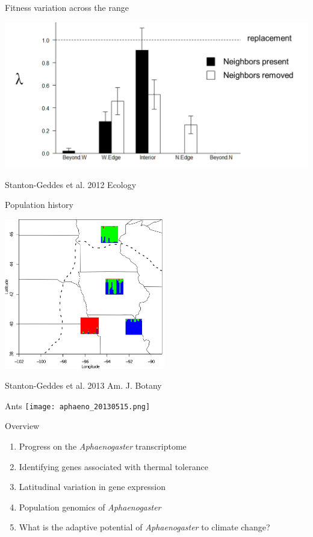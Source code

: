 \documentclass{beamer}
\begin{document}
\begin{frame}{Fitness variation across the range}
	\begin{center}
		\includegraphics[width=\textwidth, height=\textheight, keepaspectratio]{chamae2010_popgrowth.png}
	\end{center}
	\tiny{Stanton-Geddes et al. 2012 Ecology}
\end{frame}

\begin{frame}{Population history}
	\begin{center}
		\includegraphics[width=7cm]{chamae_popgen.png}
	\end{center}	
	\tiny{Stanton-Geddes et al. 2013 Am. J. Botany}
\end{frame}

\begin{frame}{Ants}
		\texttt{[image: aphaeno\_20130515.png]}
\end{frame}

\begin{frame}{Overview}
  \begin{enumerate}
  	\item<1-| alert@1> Progress on the \textit{Aphaenogaster} transcriptome
  	\item Identifying genes associated with thermal tolerance
	\item Latitudinal variation in gene expression
  	\item Population genomics of \textit{Aphaenogaster}
  	\item What is the adaptive potential of \textit{Aphaenogaster} to climate change?
  \end{enumerate}
\end{frame}
\end{document}
